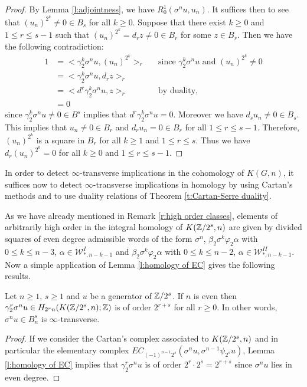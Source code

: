 \begin{proof}
By Lemma \ref{l:adjointness}, we have $R^1_0(\sigma^n u,u_n)$. It suffices then to see that $(u_n)^{2^k}\not=0\in B_s$ for all $k\geq0$. Suppose that there exist $k\geq0$ and $1\leq r\leq s-1$ such that $(u_n)^{2^k}=d_r z\not=0\in B_r$ for some $z\in B_r$. Then we have the following contradiction:
\begin{align*}
1&=<\gamma_2^k \sigma^n u,(u_n)^{2^k}>_r &&\text{since $\gamma_2^k \sigma^n u$ and $(u_n)^{2^k}\not=0$}\\
&=<\gamma_2^k \sigma^n u,d_r z>_r\\
&=<d^r\gamma_2^k \sigma^n u,z>_r &&\text{by duality,}\\
&=0
\end{align*} since $\gamma_2^k \sigma^n u\not=0\in B^s$ implies that $d^r\gamma_2^k \sigma^n u=0$. Moreover we have $d_s u_n\not=0\in B_s$. This implies that $u_n\not=0\in B_r$ and $d_r u_n=0\in B_r$ for all $1\leq r\leq s-1$. Therefore, $(u_n)^{2^k}$ is a square in $B_r$ for all $k\geq1$ and $1\leq r\leq s$. Thus we have $d_r(u_n)^{2^k}=0$ for all $k\geq0$ and $1\leq r\leq s-1$.
\end{proof}

In order to detect $\infty$-transverse implications in the cohomology of $K(G,n)$, it suffices now to detect $\infty$-transverse implications in homology by using Cartan's methods and to use duality relations of Theorem \ref{t:Cartan-Serre duality}.

As we have already mentioned in Remark \ref{r:high order classes}, elements of arbitrarily high order in the integral homology of $K(\mathbb{Z}/2^s,n)$ are given by divided squares of even degree admissible words of the form $\sigma^n$, $\beta_2\sigma^k\varphi_2\alpha$ with $0\leq k\leq n-3$, $\alpha\in{\mathcal W}^{I}_{*,n-k-1}$ and $\beta_2\sigma^k\varphi_2\alpha$ with $0\leq k\leq n-2$, $\alpha\in{\mathcal W}^{II}_{*,n-k-1}$. Now a simple application of Lemma \ref{l:homology of EC} gives the following results.

\begin{lem}\label{l:transversity 1}
Let $n\geq1$, $s\geq1$ and $u$ be a generator of $\mathbb{Z}/2^s$. If $n$ is even then $\gamma_2^r\sigma^n u\in H_{2^r n}(K(\mathbb{Z}/2^s,n);\mathbb{Z})$ is of order $2^{r+s}$ for all $r\geq0$. In other words, $\sigma^n u\in B_n^s$ is $\infty$-transverse.
\end{lem}

\begin{proof}
If we consider the Cartan's complex associated to $K(\mathbb{Z}/2^s,n)$ and in particular the elementary complex $EC_{(-1)^{n-1}2^s}(\sigma^n u,\sigma^{n-1}\psi_{2^s}u)$, Lemma \ref{l:homology of EC} implies that $\gamma_2^r\sigma^n u$ is of order $2^r\cdot2^s=2^{r+s}$ since $\sigma^n u$ lies in even degree.
\end{proof}

